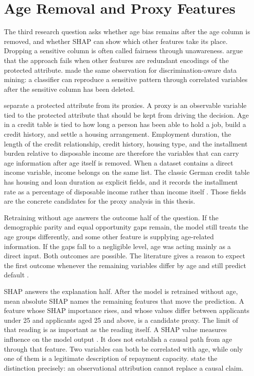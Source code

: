 \section{Age Removal and Proxy Features}
\label{sec:related-proxy}

The third research question asks whether age bias remains after the age column is removed, and whether SHAP can show which other features take its place. Dropping a sensitive column is often called fairness through unawareness. \citet{hardt2016equality} argue that the approach fails when other features are redundant encodings of the protected attribute. \citet{pedreschi2008discrimination} made the same observation for discrimination-aware data mining: a classifier can reproduce a sensitive pattern through correlated variables after the sensitive column has been deleted.

\citet{kilbertus2017proxy} separate a protected attribute from its proxies. A proxy is an observable variable tied to the protected attribute that should be kept from driving the decision. Age in a credit table is tied to how long a person has been able to hold a job, build a credit history, and settle a housing arrangement. Employment duration, the length of the credit relationship, credit history, housing type, and the installment burden relative to disposable income are therefore the variables that can carry age information after age itself is removed. When a dataset contains a direct income variable, income belongs on the same list. The classic German credit table has housing and loan duration as explicit fields, and it records the installment rate as a percentage of disposable income rather than income itself \citep{hofmann1994german}. Those fields are the concrete candidates for the proxy analysis in this thesis.

Retraining without age answers the outcome half of the question. If the demographic parity and equal opportunity gaps remain, the model still treats the age groups differently, and some other feature is supplying age-related information. If the gaps fall to a negligible level, age was acting mainly as a direct input. Both outcomes are possible. The literature gives a reason to expect the first outcome whenever the remaining variables differ by age and still predict default \citep{pedreschi2008discrimination, hardt2016equality}.

SHAP answers the explanation half. After the model is retrained without age, mean absolute SHAP names the remaining features that move the prediction. A feature whose SHAP importance rises, and whose values differ between applicants under 25 and applicants aged 25 and above, is a candidate proxy. The limit of that reading is as important as the reading itself. A SHAP value measures influence on the model output \citep{lundberg2017shap, lundberg2020treeshap}. It does not establish a causal path from age through that feature. Two variables can both be correlated with age, while only one of them is a legitimate description of repayment capacity. \citet{kilbertus2017proxy} state the distinction precisely: an observational attribution cannot replace a causal claim.


